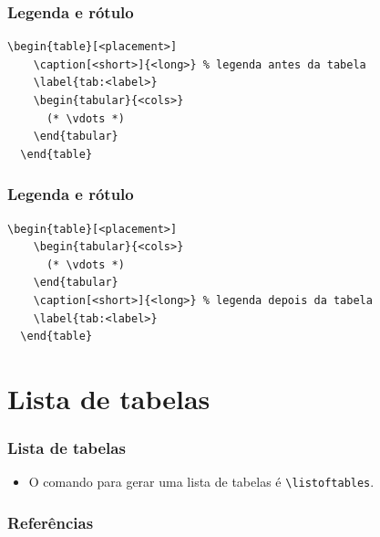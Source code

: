 \documentclass[brazilian]{beamer}
\begin{document}
\begin{frame}[fragile]
  \frametitle{Legenda e rótulo}

  \begin{lstlisting}[style=myStyleLatex]
  \begin{table}[<placement>]
    \caption[<short>]{<long>} % legenda antes da tabela
    \label{tab:<label>}
    \begin{tabular}{<cols>}
      (* \vdots *)
    \end{tabular}
  \end{table}
  \end{lstlisting}

\end{frame}

\begin{frame}[fragile]
  \frametitle{Legenda e rótulo}

  \begin{lstlisting}[style=myStyleLatex]
  \begin{table}[<placement>]
    \begin{tabular}{<cols>}
      (* \vdots *)
    \end{tabular}
    \caption[<short>]{<long>} % legenda depois da tabela
    \label{tab:<label>}
  \end{table}
  \end{lstlisting}

\end{frame}

\section{Lista de tabelas}
\begin{frame}[fragile]
  \frametitle{Lista de tabelas}

  \begin{itemize}
    \item O comando para gerar uma lista de tabelas é \lstinline[style=myStyleLatex]!\listoftables!.
  \end{itemize}

\end{frame}

\begin{frame}[allowframebreaks]
  \frametitle{Referências}
  \nocite{*}
  \printbibliography[keyword={inserirTabela}]
\end{frame}
\end{document}
